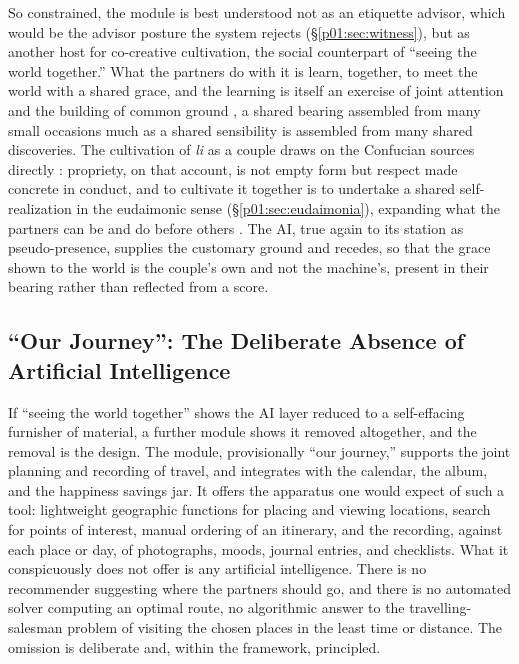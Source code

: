 So constrained, the module is best understood not as an etiquette advisor, which would be the advisor posture the system rejects (§\ref{p01:sec:witness}), but as another host for co-creative cultivation, the social counterpart of ``seeing the world together.'' What the partners do with it is learn, together, to meet the world with a shared grace, and the learning is itself an exercise of joint attention and the building of common ground \parencite{tomasello2005intentions, clark1996using}, a shared bearing assembled from many small occasions much as a shared sensibility is assembled from many shared discoveries. The cultivation of \emph{li} as a couple draws on the Confucian sources directly \parencite{ames2011confucian, tu1985confucian}: propriety, on that account, is not empty form but respect made concrete in conduct, and to cultivate it together is to undertake a shared self-realization in the eudaimonic sense (§\ref{p01:sec:eudaimonia}), expanding what the partners can be and do before others \parencite{aron1986love, aron2000couples}. The AI, true again to its station as pseudo-presence, supplies the customary ground and recedes, so that the grace shown to the world is the couple's own and not the machine's, present in their bearing rather than reflected from a score.

\subsection{``Our Journey'': The Deliberate Absence of Artificial Intelligence}\label{p01:sec:ourjourney}

If ``seeing the world together'' shows the AI layer reduced to a self-effacing furnisher of material, a further module shows it removed altogether, and the removal is the design. The module, provisionally ``our journey,'' supports the joint planning and recording of travel, and integrates with the calendar, the album, and the happiness savings jar. It offers the apparatus one would expect of such a tool: lightweight geographic functions for placing and viewing locations, search for points of interest, manual ordering of an itinerary, and the recording, against each place or day, of photographs, moods, journal entries, and checklists. What it conspicuously does not offer is any artificial intelligence. There is no recommender suggesting where the partners should go, and there is no automated solver computing an optimal route, no algorithmic answer to the travelling-salesman problem of visiting the chosen places in the least time or distance. The omission is deliberate and, within the framework, principled.

